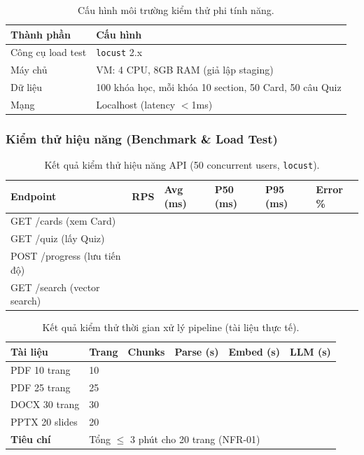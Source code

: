 \begin{table}[H]
    \centering
    \caption{Cấu hình môi trường kiểm thử phi tính năng.}
    \label{tab:test-env-nonfunc}
    \begin{tabular}{p{4cm}p{10.5cm}}
        \toprule
        \textbf{Thành phần} & \textbf{Cấu hình} \\
        \midrule
        Công cụ load test & \texttt{locust} 2.x \\
        Máy chủ           & VM: 4 CPU, 8GB RAM (giả lập staging) \\
        Dữ liệu           & 100 khóa học, mỗi khóa 10 section, 50 Card, 50 câu Quiz \\
        Mạng              & Localhost (latency $<$1ms) \\
        \bottomrule
    \end{tabular}
\end{table}

\subsubsection{Kiểm thử hiệu năng (Benchmark \& Load Test)}

\begin{table}[H]
    \centering
    \caption{Kết quả kiểm thử hiệu năng API (50 concurrent users, \texttt{locust}).}
    \label{tab:load-test}
    \begin{tabular}{p{4cm}p{2cm}p{2.5cm}p{2.5cm}p{2.5cm}p{2cm}}
        \toprule
        \textbf{Endpoint} & \textbf{RPS} & \textbf{Avg (ms)} &
        \textbf{P50 (ms)} & \textbf{P95 (ms)} & \textbf{Error \%} \\
        \midrule
        GET /cards (xem Card)   & & & & & \\
        GET /quiz (lấy Quiz)    & & & & & \\
        POST /progress (lưu tiến độ) & & & & & \\
        GET /search (vector search) & & & & & \\
        \bottomrule
    \end{tabular}
\end{table}

\begin{table}[H]
    \centering
    \caption{Kết quả kiểm thử thời gian xử lý pipeline (tài liệu thực tế).}
    \label{tab:pipeline-test}
    \begin{tabular}{p{3cm}p{2cm}p{2cm}p{2.5cm}p{2.5cm}p{2.5cm}}
        \toprule
        \textbf{Tài liệu} & \textbf{Trang} & \textbf{Chunks} &
        \textbf{Parse (s)} & \textbf{Embed (s)} & \textbf{LLM (s)} \\
        \midrule
        PDF 10 trang    & 10 & & & & \\
        PDF 25 trang    & 25 & & & & \\
        DOCX 30 trang   & 30 & & & & \\
        PPTX 20 slides  & 20 & & & & \\
        \midrule
        \textbf{Tiêu chí} & \multicolumn{5}{l}{Tổng $\leq$ 3 phút cho 20 trang (NFR-01)} \\
        \bottomrule
    \end{tabular}
\end{table}

